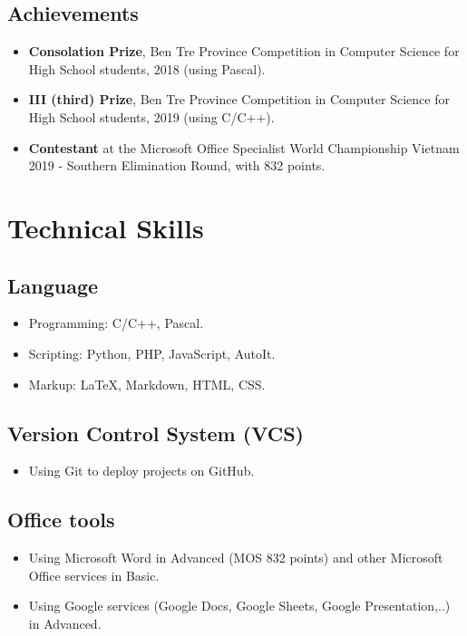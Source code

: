 \documentclass{article}
\begin{document}
        \subsection{Achievements}
            \begin{itemize}
                \item {\bfseries{Consolation Prize}}, Ben Tre Province Competition in Computer Science for High School students, 2018 (using Pascal).
                \item {\bfseries{III (third) Prize}}, Ben Tre Province Competition in Computer Science for High School students, 2019 (using C/C++).
                \item {\bfseries{Contestant}} at the Microsoft Office Specialist World Championship Vietnam 2019 - Southern Elimination Round, with 832 points.
            \end{itemize}

    \section{Technical Skills}
        \subsection{Language}
        \begin{itemize}
            \item Programming: C/C++, Pascal.
            \item Scripting: Python, PHP, JavaScript, AutoIt.
            \item Markup: \LaTeX, Markdown, HTML, CSS.
        \end{itemize}

        \subsection{Version Control System (VCS)}
        \begin{itemize}
            \item Using Git to deploy projects on GitHub.
        \end{itemize}

        \subsection{Office tools}
        \begin{itemize}
            \item Using Microsoft Word in Advanced (MOS 832 points) and other Microsoft Office services in Basic.
            \item Using Google services (Google Docs, Google Sheets, Google Presentation,..) in Advanced.
        \end{itemize}
\end{document}
